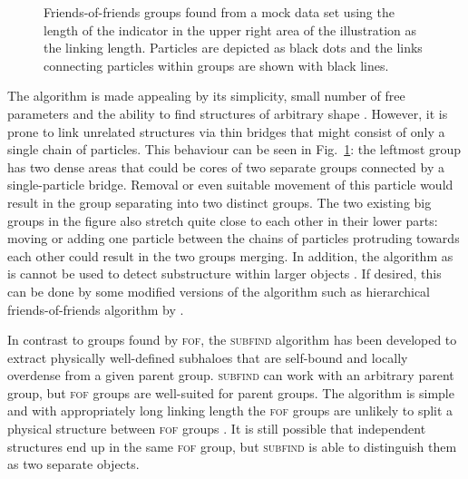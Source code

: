 \documentclass[english, twoside]{HYgradu}
\begin{document}
\begin{figure}
    \centering
    
    \caption{Friends-of-friends groups found from a mock data set using the length of the indicator in the upper right area of the illustration as the linking length. Particles are depicted as black dots and the links connecting particles within groups are shown with black lines.}\label{fig:fof}
\end{figure}

The algorithm is made appealing by its simplicity, small number of free parameters and the ability to find structures of arbitrary shape \citep{davis1985evolution}. However, it is prone to link unrelated structures via thin bridges that might consist of only a single chain of particles. This behaviour can be seen in Fig.\ \ref{fig:fof}: the leftmost group has two dense areas that could be cores of two separate groups connected by a single-particle bridge. Removal or even suitable movement of this particle would result in the group separating into two distinct groups. The two existing big groups in the figure also stretch quite close to each other in their lower parts: moving or adding one particle between the chains of particles protruding towards each other could result in the two groups merging. In addition, the algorithm as is cannot be used to detect substructure within larger objects \citep{springel2001populating}. If desired, this can be done by some modified versions of the algorithm such as hierarchical friends-of-friends algorithm by \citet{Gottlober1999halo}.

In contrast to groups found by \textsc{fof}, the \textsc{subfind} algorithm has been developed to extract physically well-defined subhaloes that are self-bound and locally overdense from a given parent group. \textsc{subfind} can work with an arbitrary parent group, but \textsc{fof} groups are well-suited for parent groups. The algorithm is simple and with appropriately long linking length the \textsc{fof} groups are unlikely to split a physical structure between \textsc{fof} groups \citep{springel2001populating}. It is still possible that independent structures end up in the same \textsc{fof} group, but \textsc{subfind} is able to distinguish them as two separate objects.
\end{document}
